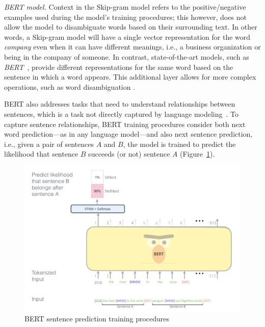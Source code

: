 \medskip
\begin{hangparas}{.0in}{0}
     \textit{BERT model.} Context in the Skip-gram model refers to the positive/negative examples used during the model's training procedures; this however, does not allow the model to disambiguate words based on their surrounding text. In other words, a Skip-gram model will have a single vector representation for the word \textit{company} even when it can have different meanings, i.e., a business organization or being in the company of someone. In contrast, state-of-the-art models, such as \textit{BERT}~\cite{Devlin2018Bert}, provide different representations for the same word based on the sentence in which a word appears.
    This additional layer allows for more complex operations, such as word disambiguation .
\end{hangparas}


BERT also addresses tasks that need to understand relationships between sentences, which is a task not directly captured by language modeling~\cite{Devlin2018Bert}.
To capture sentence relationships, BERT training procedures consider both next word prediction---as in any language model---and also next sentence prediction, i.e., given a pair of sentences $A$ and $B$, the model 
is trained to predict the likelihood that sentence $B$ succeeds (or not) sentence $A$ (Figure~\ref{fig:BERT}). 


\begin{figure}
    \centering
    \includegraphics[width=.75\linewidth]{fig/cp5/BERT}
    \caption{BERT sentence prediction training procedures }
    \label{fig:BERT}
\end{figure}



